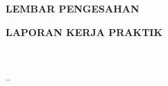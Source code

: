 %

\fontsize{11}{16}\selectfont

\begin{center}
    \textbf{LEMBAR PENGESAHAN}
    
    \vspace{0.5cm}
    
    \textbf{LAPORAN KERJA PRAKTIK}
    
    \vspace{0.5cm}
    
    \textbf{\MakeUppercase{\namaUniv}} \\
    \textbf{\MakeUppercase{\namaLab}}
    
    \vspace{0.5cm}
    
    \textbf{\judul}
    
    \vspace{0.5cm}
    
    \startMagang -- \akhirMagang
\end{center}

\vspace{2cm} %

